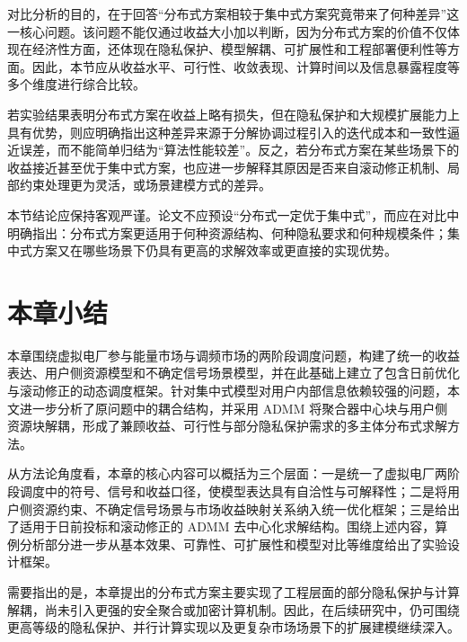 对比分析的目的，在于回答“分布式方案相较于集中式方案究竟带来了何种差异”这一核心问题。该问题不能仅通过收益大小加以判断，因为分布式方案的价值不仅体现在经济性方面，还体现在隐私保护、模型解耦、可扩展性和工程部署便利性等方面。因此，本节应从收益水平、可行性、收敛表现、计算时间以及信息暴露程度等多个维度进行综合比较。

若实验结果表明分布式方案在收益上略有损失，但在隐私保护和大规模扩展能力上具有优势，则应明确指出这种差异来源于分解协调过程引入的迭代成本和一致性逼近误差，而不能简单归结为“算法性能较差”。反之，若分布式方案在某些场景下的收益接近甚至优于集中式方案，也应进一步解释其原因是否来自滚动修正机制、局部约束处理更为灵活，或场景建模方式的差异。

本节结论应保持客观严谨。论文不应预设“分布式一定优于集中式”，而应在对比中明确指出：分布式方案更适用于何种资源结构、何种隐私要求和何种规模条件；集中式方案又在哪些场景下仍具有更高的求解效率或更直接的实现优势。

\section{本章小结}
\label{sec:vpp_admm_summary}

本章围绕虚拟电厂参与能量市场与调频市场的两阶段调度问题，构建了统一的收益表达、用户侧资源模型和不确定信号场景模型，并在此基础上建立了包含日前优化与滚动修正的动态调度框架。针对集中式模型对用户内部信息依赖较强的问题，本文进一步分析了原问题中的耦合结构，并采用 ADMM 将聚合器中心块与用户侧资源块解耦，形成了兼顾收益、可行性与部分隐私保护需求的多主体分布式求解方法。

从方法论角度看，本章的核心内容可以概括为三个层面：一是统一了虚拟电厂两阶段调度中的符号、信号和收益口径，使模型表达具有自洽性与可解释性；二是将用户侧资源约束、不确定信号场景与市场收益映射关系纳入统一优化框架；三是给出了适用于日前投标和滚动修正的 ADMM 去中心化求解结构。围绕上述内容，算例分析部分进一步从基本效果、可靠性、可扩展性和模型对比等维度给出了实验设计框架。

需要指出的是，本章提出的分布式方案主要实现了工程层面的部分隐私保护与计算解耦，尚未引入更强的安全聚合或加密计算机制。因此，在后续研究中，仍可围绕更高等级的隐私保护、并行计算实现以及更复杂市场场景下的扩展建模继续深入。